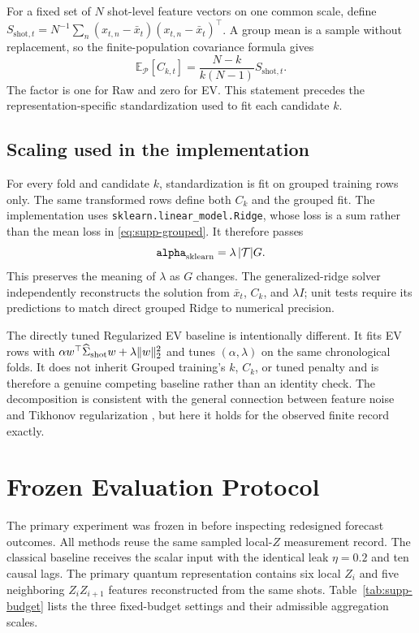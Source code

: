 \documentclass[10pt,conference]{IEEEtran}
\begin{document}
For a fixed set of $N$ shot-level feature vectors on one common scale, define
$S_{\mathrm{shot},t}=N^{-1}\sum_n(x_{t,n}-\bar{x}_t)
(x_{t,n}-\bar{x}_t)^\top$. A group mean is a sample without replacement, so
the finite-population covariance formula gives
\begin{equation}
  \mathbb E_{\mathcal P}[C_{k,t}]
  =\frac{N-k}{k(N-1)}S_{\mathrm{shot},t}.
  \label{eq:supp-expected-group-covariance}
\end{equation}
The factor is one for Raw and zero for EV. This statement precedes the
representation-specific standardization used to fit each candidate $k$.

\subsection{Scaling used in the implementation}

For every fold and candidate $k$, standardization is fit on grouped training
rows only.  The same transformed rows define both $C_k$ and the grouped fit.
The implementation uses \texttt{sklearn.linear\_model.Ridge}, whose loss is a
sum rather than the mean loss in \eqref{eq:supp-grouped}.  It therefore passes
\begin{equation}
  \texttt{alpha}_{\rm sklearn}=\lambda\,|\mathcal T|G.
  \label{eq:supp-sklearn-scaling}
\end{equation}
This preserves the meaning of $\lambda$ as $G$ changes.  The generalized-ridge
solver independently reconstructs the solution from $\bar{x}_t$, $C_k$, and
$\lambda I$; unit tests require its predictions to match direct grouped Ridge
to numerical precision.

The directly tuned Regularized EV baseline is intentionally different. It fits
EV rows with
$\alpha w^\top\widehat\Sigma_{\rm shot}w+\lambda\lVert w\rVert_2^2$ and
tunes $(\alpha,\lambda)$ on the same chronological folds. It does not inherit
Grouped training's $k$, $C_k$, or tuned penalty and is therefore a genuine competing
baseline rather than an identity check.  The decomposition is consistent with
the general connection between feature noise and Tikhonov regularization
\cite{bishop1995training}, but here it holds for the observed finite record
exactly.

\section{Frozen Evaluation Protocol}
\label{app:protocol}

The primary experiment was frozen in
 before inspecting redesigned forecast
outcomes.  All methods reuse the same sampled local-$Z$ measurement record.  The classical
baseline receives the scalar input with the identical leak $\eta=0.2$ and ten
causal lags.  The primary quantum representation contains six local $Z_i$ and
five neighboring $Z_iZ_{i+1}$ features reconstructed from the same shots.
Table~\ref{tab:supp-budget} lists the three fixed-budget settings and their
admissible aggregation scales.
\end{document}
